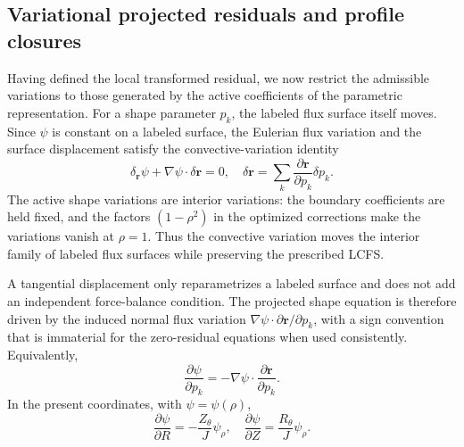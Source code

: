 \documentclass[final, 3p, times]{elsarticle}
\begin{document}
\subsection{Variational projected residuals and profile closures}

Having defined the local transformed residual, we now restrict the admissible variations to those generated by the active coefficients of the parametric representation. For a shape parameter $p_k$, the labeled flux surface itself moves. Since $\psi$ is constant on a labeled surface, the Eulerian flux variation and the surface displacement satisfy the convective-variation identity
\begin{equation}
    \delta_{\mathbf{r}}\psi+\nabla\psi\cdot\delta\mathbf{r}=0,
    \quad
    \delta\mathbf{r}=\sum_k \frac{\partial\mathbf{r}}{\partial p_k}\delta p_k .
\end{equation}
The active shape variations are interior variations: the boundary coefficients are held fixed, and the factors $(1-\rho^2)$ in the optimized corrections make the variations vanish at $\rho=1$. Thus the convective variation moves the interior family of labeled flux surfaces while preserving the prescribed LCFS.

A tangential displacement only reparametrizes a labeled surface and does not add an independent force-balance condition. The projected shape equation is therefore driven by the induced normal flux variation $\nabla\psi\cdot\partial\mathbf{r}/\partial p_k$, with a sign convention that is immaterial for the zero-residual equations when used consistently. Equivalently,
\begin{equation}
    \frac{\partial\psi}{\partial p_k}
    =-\nabla\psi\cdot\frac{\partial\mathbf{r}}{\partial p_k}.
\end{equation}
In the present coordinates, with $\psi=\psi(\rho)$,
\begin{equation}
    \frac{\partial\psi}{\partial R}=-\frac{Z_\theta}{J}\psi_\rho,
    \quad
    \frac{\partial\psi}{\partial Z}=\frac{R_\theta}{J}\psi_\rho.
\end{equation}
\end{document}
